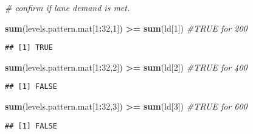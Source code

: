\documentclass[
]{article}
\newenvironment{Shaded}{\begin{snugshade}}{\end{snugshade}}
\newcommand{\CommentTok}[1]{\textcolor[rgb]{0.56,0.35,0.01}{\textit{#1}}}
\newcommand{\DecValTok}[1]{\textcolor[rgb]{0.00,0.00,0.81}{#1}}
\newcommand{\KeywordTok}[1]{\textcolor[rgb]{0.13,0.29,0.53}{\textbf{#1}}}
\newcommand{\NormalTok}[1]{#1}
\newcommand{\OperatorTok}[1]{\textcolor[rgb]{0.81,0.36,0.00}{\textbf{#1}}}
\newcommand{\StringTok}[1]{\textcolor[rgb]{0.31,0.60,0.02}{#1}}
\begin{document}
\begin{Shaded}
\begin{Highlighting}[]
\CommentTok{# confirm if lane demand is met.}

\KeywordTok{sum}\NormalTok{(levels.pattern.mat[}\DecValTok{1}\OperatorTok{:}\DecValTok{32}\NormalTok{,}\DecValTok{1}\NormalTok{]) }\OperatorTok{>=}\StringTok{ }\KeywordTok{sum}\NormalTok{(ld[}\DecValTok{1}\NormalTok{]) }\CommentTok{#TRUE  for 200}
\end{Highlighting}
\end{Shaded}

\begin{verbatim}
## [1] TRUE
\end{verbatim}

\begin{Shaded}
\begin{Highlighting}[]
\KeywordTok{sum}\NormalTok{(levels.pattern.mat[}\DecValTok{1}\OperatorTok{:}\DecValTok{32}\NormalTok{,}\DecValTok{2}\NormalTok{]) }\OperatorTok{>=}\StringTok{ }\KeywordTok{sum}\NormalTok{(ld[}\DecValTok{2}\NormalTok{]) }\CommentTok{#TRUE  for 400}
\end{Highlighting}
\end{Shaded}

\begin{verbatim}
## [1] FALSE
\end{verbatim}

\begin{Shaded}
\begin{Highlighting}[]
\KeywordTok{sum}\NormalTok{(levels.pattern.mat[}\DecValTok{1}\OperatorTok{:}\DecValTok{32}\NormalTok{,}\DecValTok{3}\NormalTok{]) }\OperatorTok{>=}\StringTok{ }\KeywordTok{sum}\NormalTok{(ld[}\DecValTok{3}\NormalTok{]) }\CommentTok{#TRUE  for 600}
\end{Highlighting}
\end{Shaded}

\begin{verbatim}
## [1] FALSE
\end{verbatim}
\end{document}
